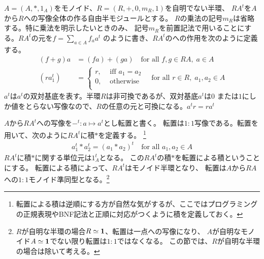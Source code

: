 		$A=(A,*,1_A)$をモノイド、$R=(R,+,0,m_R,1)$を自明でない半環、
		$RA^t$を$A$から$R$への写像全体の作る自由半モジュールとする。
		$R$の乗法の記号$m_R$は省略する。特に乗法を明示したいときのみ、
		記号$m_R$を前置記法で用いることにする。$RA^t$の元を$f=\sum_{a\in A}f_aa^t$
		のように書き、$RA^t$のへの作用を次のように定義する。
		\begin{equation}\begin{split} %
			(f+g)a &= (fa) + (ga) \quad\text{for all }f,g\in RA,\;a\in A \\
			(ra_1^t) &= \begin{cases} %
				r, &\text{ iff } a_1=a_2 \\
				0, &\text{ otherwise } \\
			\end{cases} \quad\text{for all }r\in R,\;a_1,a_2\in A %
		\end{split}\end{equation} %
		$a^t$は$a^t$の双対基底を表す。半環$R$は非可換であるが、双対基底$a^t$は$0$
		または$1$にしか値をとらない写像なので、$R$の任意の元と可換になる。$a^tr=ra^t$

		$A$から$RA^t$への写像を$-^t:a\mapsto a^t$とし転置と書く。
		転置は$1:1$写像である。転置を用いて、次のように$RA^t$に積$*$を定義する。
		\footnote {
			転置による積は逆順にする方が自然な気がするが、ここではプログラミング
			の正規表現やBNF記法と正順に対応がつくように積を定義しておく。
		}
		\begin{equation}\begin{split} %
			a_1^t*a_2^t = (a_1*a_2)^t \quad\text{for all }a_1,a_2\in A
		\end{split}\end{equation} %
		$RA^t$に積$*$に関する単位元は$1_A^t$となる。
		この$RA^t$の積$*$を転置による積ということにする。
		転置による積によって、$RA^t$はモノイド半環となり、
		転置は$A$から$RA$への$1:1$モノイド準同型となる。\footnote {
			$R$が自明な半環の場合$R\simeq{\mathbf{1}}$、転置は一点への写像になり、
			$A$が自明なモノイド$A\simeq{\mathbf{1}}$でない限り転置は$1:1$ではなくなる。
			この節では、$R$が自明な半環の場合は除いて考える。
		}

